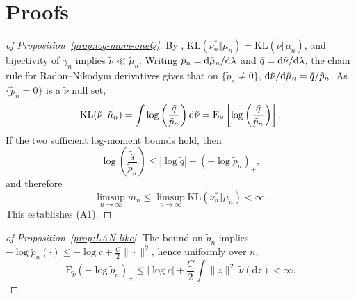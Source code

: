 \documentclass[11pt]{article}
\theoremstyle{plain}
\theoremstyle{definition}
\theoremstyle{remark}
\begin{document}
\newpage

\appendix

\section{Proofs}
\label{sec:proofs}


\begin{proof}[of Proposition~\ref{prop:log-mom-oneQ}]
By \citet[Cor. 2.18]{polyanskiy_wu_2025_information_theory}, $\mathrm{KL}(\nu_{n}^{*}\Vert\mu_{n})=\mathrm{KL}(\tilde\nu\Vert\tilde\mu_n)$,
and bijectivity of $\gamma_{n}$ implies $\tilde\nu\ll\tilde\mu_n$. Writing
$\tilde p_{n}={\rm d}\tilde\mu_n/{\rm d}\lambda$ and $\tilde q={\rm d}\tilde\nu/{\rm d}\lambda$,
the chain rule for Radon--Nikodym derivatives gives that on $\{\tilde p_{n}\neq 0\}$, ${\rm d}\tilde\nu/{\rm d}\tilde\mu_n=\tilde q/\tilde p_{n}$. As $\{\tilde p_{n}=0\}$ is a $\tilde\nu$ null set,
\[
\mathrm{KL}(\tilde\nu\Vert\tilde\mu_n)=\int\log\left(\frac{\tilde q}{\tilde p_{n}}\right){\rm d}\tilde\nu=\mathrm{E}_{\tilde\nu}\left[\log\left(\frac{\tilde q}{\tilde p_{n}}\right)\right].
\]
If the two sufficient log-moment bounds hold, then
\[
\log\left(\frac{\tilde q}{\tilde p_n}\right)\le |\log \tilde q|+(-\log \tilde p_n)_+,
\]
and therefore
\[\limsup_{n\to\infty} m_n \leq \limsup_{n\to\infty} \mathrm{KL}(\nu_{n}^{*}\Vert\mu_{n}) < \infty.\]
This establishes (A1).
\end{proof}

\begin{proof}[of Proposition~\ref{prop:LAN-like}]
The bound on $\tilde p_{n}$ implies $-\log \tilde p_{n}(\cdot)\le-\log c+\frac{C}{2}\|\cdot\|^{2}$,
hence uniformly over $n$,
\[
\mathrm{E}_{\tilde\nu}(-\log \tilde p_{n})_+\le |\log c|+\frac{C}{2}\int\| z\|^{2}~\tilde{\nu}(\mathrm{d}z)<\infty.
\]

\end{proof}
\end{document}
